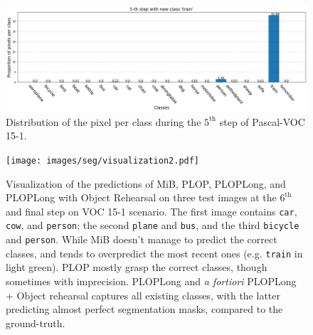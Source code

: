 

\begin{figure}
    \centering
    \includegraphics[width=\linewidth]{images/seg/distribution_5step_voc.png}
    \vspace*{-0.3cm}
    \caption{Distribution of the pixel per class during the $5^{\text{th}}$ step of Pascal-VOC
        15-1.}
    \label{fig:distribution_voc_5th}
\end{figure}

\begin{figure}
    \centering
    \texttt{[image: images/seg/visualization2.pdf]}
    \caption{Visualization of the predictions of MiB, PLOP, PLOPLong, and PLOPLong with Object
        Rehearsal on three test images at the $6^\text{th}$ and final step on VOC 15-1 scenario. The
        first image contains \texttt{car}, \texttt{cow}, and \texttt{person}; the second \texttt{plane}
        and \texttt{bus}, and the third \texttt{bicycle} and \texttt{person}. While MiB doesn't manage
        to predict the correct classes, and tends to overpredict the most recent ones (e.g.
        \texttt{train} in light green). PLOP mostly grasp the correct classes, though sometimes with
        imprecision. PLOPLong and \textit{a fortiori} PLOPLong + Object rehearsal captures all existing
        classes, with the latter predicting almost perfect segmentation masks, compared to the
        ground-truth.}
    \label{fig:visualization}
\end{figure}


